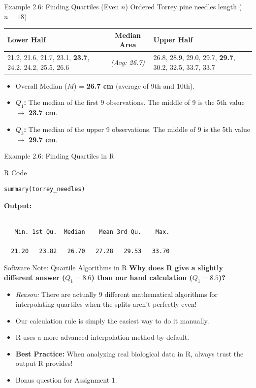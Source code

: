 \documentclass[aspectratio=169]{beamer}
\begin{document}
\begin{frame}{Example 2.6: Finding Quartiles (Even $n$)}
Ordered Torrey pine needles length ($n=18$)
\vspace{0.2cm}
\begin{table}
\centering
\scriptsize
\begin{tabular}{p{4cm}cp{4cm}}
\toprule
\textbf{Lower Half} & \textbf{Median Area} & \textbf{Upper Half} \\
\midrule
21.2, 21.6, 21.7, 23.1, \textbf{23.7}, 24.2, 24.2, 25.5, 26.6 & \emph{(Avg: 26.7)} & 26.8, 28.9, 29.0, 29.7, \textbf{29.7}, 30.2, 32.5, 33.7, 33.7 \\
\bottomrule
\end{tabular}
\end{table}
\vspace{0.2cm}
\begin{itemize}
	\item Overall Median ($M$) = \textbf{26.7 cm} (average of 9th and 10th).
	\item \textbf{$Q_1$:} The median of the first 9 observations. The middle of 9 is the 5th value $\rightarrow$ \textbf{23.7 cm}.
	\item \textbf{$Q_3$:} The median of the upper 9 observations. The middle of 9 is the 5th value $\rightarrow$ \textbf{29.7 cm}.
 \end{itemize}
\end{frame}


\begin{frame}[fragile]{Example 2.6: Finding Quartiles in R}
\begin{block}{R Code}
\begin{verbatim}
summary(torrey_needles)
\end{verbatim}
\end{block}
\textbf{Output:}
\begin{verbatim}

   Min. 1st Qu.  Median    Mean 3rd Qu.    Max. 

  21.20   23.82   26.70   27.28   29.53   33.70 

\end{verbatim}
\end{frame}

\begin{frame}{Software Note: Quartile Algorithms in R}
\textbf{Why does R give a slightly different answer ($Q_1 = 8.6$) than our hand calculation ($Q_1 = 8.5$)?}
\begin{itemize}
\item \emph{Reason:} There are actually 9 different mathematical algorithms for interpolating quartiles when the splits aren't perfectly even!
	\item Our calculation rule is simply the easiest way to do it manually. 
	\item R uses a more advanced interpolation method by default.
	\item \textbf{Best Practice:} When analyzing real biological data in R, always trust the output R provides!
	\item Bonus question for Assignment 1.
\end{itemize}
\end{frame}
\end{document}

